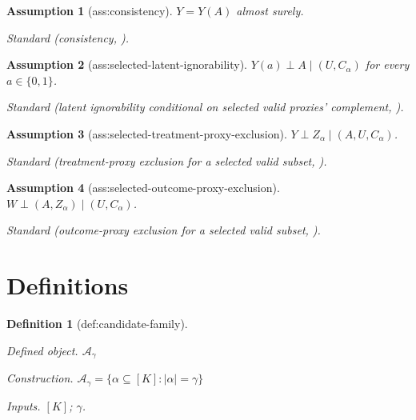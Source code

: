 \documentclass{article}
\newtheorem{assumption}{Assumption}
\newtheorem{definition}{Definition}
\begin{document}
\begin{assumption}[ass:consistency]\label{ass:consistency}
\(Y=Y(A)\) almost surely.
\par\smallskip\noindent\emph{Standard} (consistency, \cite{YuShiTchetgen2025}).
\end{assumption}

\begin{assumption}[ass:selected-latent-ignorability]\label{ass:selected-latent-ignorability}
\(Y(a)\perp A\mid(U,C_\alpha)\) for every \(a\in\{0,1\}\).
\par\smallskip\noindent\emph{Standard} (latent ignorability conditional on selected valid proxies' complement, \cite{YuShiTchetgen2025}).
\end{assumption}

\begin{assumption}[ass:selected-treatment-proxy-exclusion]\label{ass:selected-treatment-proxy-exclusion}
\(Y\perp Z_\alpha\mid(A,U,C_\alpha)\).
\par\smallskip\noindent\emph{Standard} (treatment-proxy exclusion for a selected valid subset, \cite{YuShiTchetgen2025}).
\end{assumption}

\begin{assumption}[ass:selected-outcome-proxy-exclusion]\label{ass:selected-outcome-proxy-exclusion}
\(W\perp(A,Z_\alpha)\mid(U,C_\alpha)\).
\par\smallskip\noindent\emph{Standard} (outcome-proxy exclusion for a selected valid subset, \cite{YuShiTchetgen2025}).
\end{assumption}

\section{Definitions}

\begin{definition}[def:candidate-family]\label{def:candidate-family}
\par\smallskip\noindent\emph{Defined object.} \(\mathcal A_\gamma\)
\par\smallskip\noindent\emph{Construction.} \(\mathcal A_\gamma=\{\alpha\subseteq[K]:|\alpha|=\gamma\}\)
\par\smallskip\noindent\emph{Inputs.} \([K]\); \(\gamma\).
\end{definition}
\end{document}
